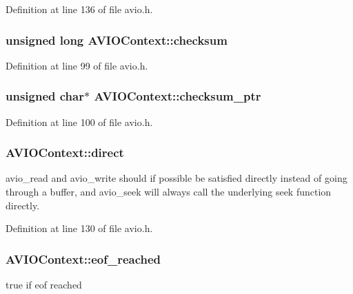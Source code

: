 Definition at line 136 of file avio.\+h.

\subsubsection[{\texorpdfstring{checksum}{checksum}}]{\setlength{\rightskip}{0pt plus 5cm}unsigned long A\+V\+I\+O\+Context\+::checksum}\hypertarget{struct_a_v_i_o_context_a949cd6dbd89e2d5d59f5c768754004ca}{}\label{struct_a_v_i_o_context_a949cd6dbd89e2d5d59f5c768754004ca}


Definition at line 99 of file avio.\+h.

\subsubsection[{\texorpdfstring{checksum\+\_\+ptr}{checksum_ptr}}]{\setlength{\rightskip}{0pt plus 5cm}unsigned char$\ast$ A\+V\+I\+O\+Context\+::checksum\+\_\+ptr}\hypertarget{struct_a_v_i_o_context_a10cbe217c46aeb653d360a9391aff310}{}\label{struct_a_v_i_o_context_a10cbe217c46aeb653d360a9391aff310}


Definition at line 100 of file avio.\+h.

\subsubsection[{\texorpdfstring{direct}{direct}}]{ A\+V\+I\+O\+Context\+::direct}\hypertarget{struct_a_v_i_o_context_af719be70947f5f8eebaa5f8ac58fd306}{}\label{struct_a_v_i_o_context_af719be70947f5f8eebaa5f8ac58fd306}
avio\+\_\+read and avio\+\_\+write should if possible be satisfied directly instead of going through a buffer, and avio\+\_\+seek will always call the underlying seek function directly. 

Definition at line 130 of file avio.\+h.

\subsubsection[{\texorpdfstring{eof\+\_\+reached}{eof_reached}}]{ A\+V\+I\+O\+Context\+::eof\+\_\+reached}\hypertarget{struct_a_v_i_o_context_aa9214f54c01f07076e0a0718b2e9c27b}{}\label{struct_a_v_i_o_context_aa9214f54c01f07076e0a0718b2e9c27b}
true if eof reached 

